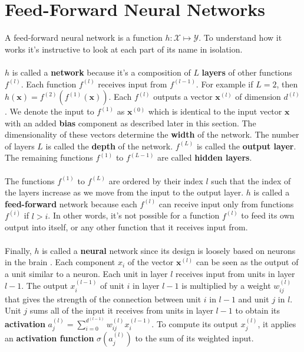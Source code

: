 \section{Feed-Forward Neural Networks}
A feed-forward neural network is a function $h: \mathcal{X} \mapsto \mathcal{Y}$. To understand how it works it's instructive to look at each part of its name in isolation.
\\\\
$h$ is called a \textbf{network} because it's a composition of $L$ \textbf{layers} of other functions $f^{(l)}$. Each function $f^{(l)}$ receives input from $f^{(l-1)}$. For example if $L = 2$, then $h(\mathbf{x}) = f^{(2)}(f^{(1)}(\mathbf{x}))$. Each $f^{(l)}$ outputs a vector $\mathbf{x}^{(l)}$ of dimension $d^{(l)}$.  We denote the input to $f^{(1)}$ as $\mathbf{x}^{(0)}$ which is identical to the input vector $\mathbf{x}$ with an added \textbf{bias} component as described later in this section. The dimensionality of these vectors determine the \textbf{width} of the network. The number of layers $L$ is called the \textbf{depth} of the network. $f^{(L)}$ is called the \textbf{output layer}. The remaining functions $f^{(1)}$ to $f^{(L-1)}$ are called \textbf{hidden layers}. 
\\\\
The functions $f^{(1)}$ to $f^{(L)}$ are ordered by their index $l$ such that the index of the layers increase as we move from the input to the output layer. $h$ is called a \textbf{feed-forward} network because each $f^{(l)}$ can receive input only from functions $f^{(i)}$ if $l > i$. In other words, it's not possible for a function $f^{(l)}$ to feed its own output into itself, or any other function that it receives input from.
\\\\
Finally, $h$ is called a \textbf{neural} network since its design is loosely based on neurons in the brain \citep{goodfellow16}. Each component $x_i$ of the vector $\mathbf{x}^{(l)}$ can be seen as the output of a unit similar to a neuron. Each unit in layer $l$ receives input from units in layer $l-1$. The output $x^{(l-1)}_i$ of unit $i$ in layer $l-1$ is multiplied by a weight $w^{(l)}_{ij}$ that gives the strength of the connection between unit $i$ in $l-1$ and unit $j$ in $l$. Unit $j$ sums all of the input it receives from units in layer $l-1$ to obtain its \textbf{activation} $a^{(l)}_j = \sum_{i=0}^{d^{(l-1)}} w^{(l)}_{ij}x^{(l-1)}_{i}$. To compute its output $x^{(l)}_j$, it applies an \textbf{activation function} $\sigma(a^{(l)}_j)$ to the sum of its weighted input.

